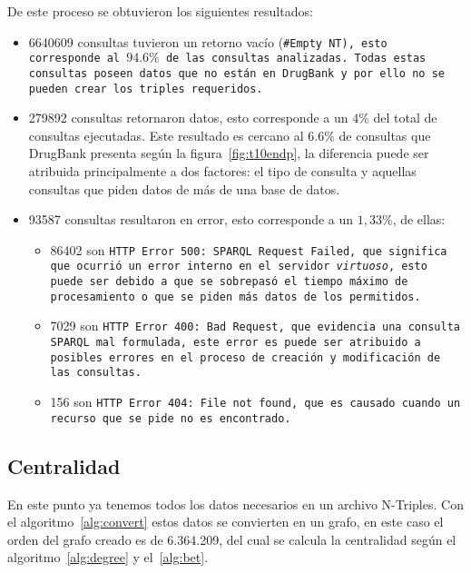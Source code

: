 De este proceso se obtuvieron los siguientes resultados:
\begin{itemize}
  \item
    6640609 consultas tuvieron un retorno vacío (\tt{\#Empty NT}), esto
    corresponde al $94.6\%$ de las consultas analizadas. Todas estas consultas
    poseen datos que no están en DrugBank y por ello no se pueden crear los
    triples requeridos.
  \item
    279892 consultas retornaron datos, esto corresponde a un $4\%$ del total de
    consultas ejecutadas. Este resultado es cercano al $6.6\%$ de consultas que
    DrugBank presenta según la figura~\ref{fig:t10endp}, la diferencia puede ser
    atribuida principalmente a dos factores: el tipo de consulta y aquellas
    consultas que piden datos de más de una base de datos.
  \item
    93587 consultas resultaron en error, esto corresponde a un $1,33\%$, de
    ellas:
    \begin{itemize}
      \item
        86402 son \tt{HTTP Error 500: SPARQL Request Failed}, que significa que
        ocurrió un error interno en el servidor \emph{virtuoso}, esto puede ser
        debido a que se sobrepasó el tiempo máximo de procesamiento o que se
        piden más datos de los permitidos.
      \item 
        7029 son \tt{HTTP Error 400: Bad Request}, que evidencia una consulta
        SPARQL mal formulada, este error es puede ser atribuido a posibles
        errores en el proceso de creación y modificación de las consultas.
      \item
        156 son \tt{HTTP Error 404: File not found}, que es causado cuando un
        recurso que se pide no es encontrado.
    \end{itemize}
\end{itemize}

\subsection{Centralidad}\label{sec:res:cent}
En este punto ya tenemos todos los datos necesarios en un archivo N-Triples. Con
el algoritmo~\ref{alg:convert} estos datos se convierten en un grafo, en este
caso el orden del grafo creado es de 6.364.209, del cual se calcula la
centralidad según el algoritmo~\ref{alg:degree} y el~\ref{alg:bet}.

